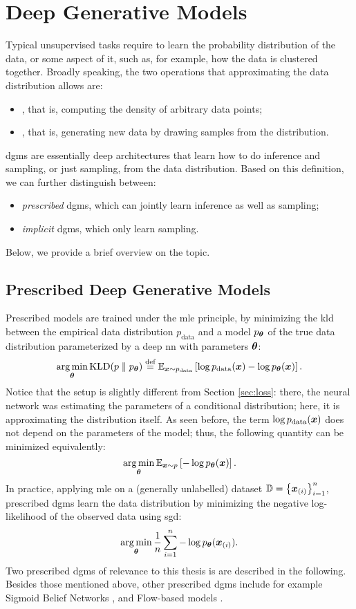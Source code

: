 \section{Deep Generative Models}\label{sec:dgm}
Typical unsupervised tasks require to learn the probability distribution of the data, or some aspect of it, such as, for example, how the data is clustered together. Broadly speaking, the two operations that approximating the data distribution allows are:
\begin{itemize}
    \item {}, that is, computing the density of arbitrary data points;
    \item {}, that is, generating new data by drawing samples from the distribution.
\end{itemize}
\glspl{dgm} \citep{goodfellow2016dl} are essentially deep architectures that learn how to do inference and sampling, or just sampling, from the data distribution. Based on this definition, we can further distinguish between:
\begin{itemize}
    \item \emph{prescribed} \glspl{dgm}, which can jointly learn inference as well as sampling;
    \item \emph{implicit} \glspl{dgm}, which only learn sampling.
\end{itemize}
Below, we provide a brief overview on the topic.

\subsection{Prescribed Deep Generative Models}\label{sec:autoregressive}
Prescribed models are trained under the \gls{mle} principle, by minimizing the \gls{kld} between the empirical data distribution $p_{\mathrm{data}}$ and a model $p_{\boldsymbol{\theta}}$ of the true data distribution parameterized by a deep \gls{nn} with parameters $\boldsymbol{\theta}$:
$$\argmin_{\Param} \KLD{p}{p_{\Param}} \defeq \Expect_{\Vector{x} \sim p_{\mathrm{data}}}\Brack{\log p_{\mathrm{data}}(\Vector{x}) -\log p_{\Param}(\Vector{x})}.$$
Notice that the setup is slightly different from Section \ref{sec:loss}: there, the neural network was estimating the parameters of a conditional distribution; here, it is approximating the distribution itself. As seen before, the term $\log p_{\mathrm{data}}(\Vector{x})$ does not depend on the parameters of the model; thus, the following quantity can be minimized equivalently:
$$\argmin_{\Param} \Expect_{\Vector{x} \sim p}\Brack{-\log p_{\Param}(\Vector{x})}.$$
In practice, applying \gls{mle} on a (generally unlabelled) dataset $\Data = \Set{\PatternVector{x}{i}}_{i=1}^n$, prescribed \glspl{dgm} learn the data distribution by minimizing the negative log-likelihood of the observed data using \gls{sgd}:
$$\argmin_{\Param} \frac{1}{n} \sum_{i=1}^n -\log p_{\Param}(\PatternVector{x}{i}).$$
Two prescribed \glspl{dgm} of relevance to this thesis is are described in the following. Besides those mentioned above, other prescribed \glspl{dgm} include for example Sigmoid Belief Networks \citep{neal1992sigmoidbeliefnet}, and Flow-based models \citep{rezende2015normalizingflows}.


